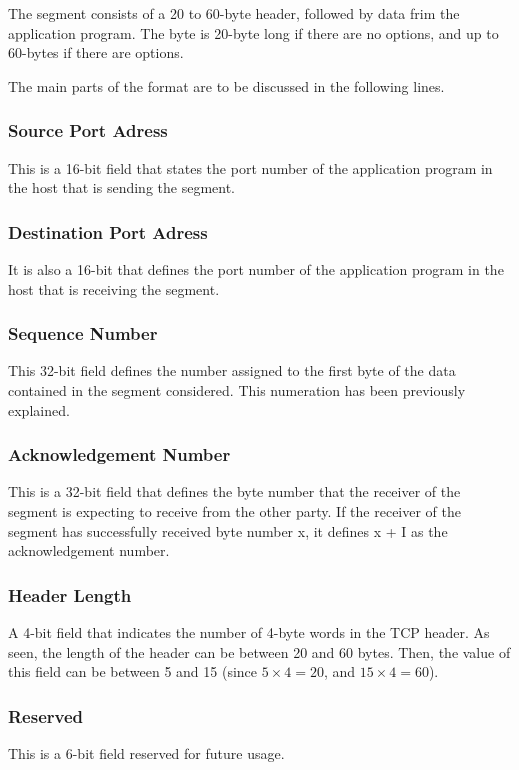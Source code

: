 \documentclass[12pt,a4paper]{report}
\begin{document}
The segment consists of a 20 to 60-byte header, followed by data frim the application program. The byte is 20-byte long if there are no options, and up to 60-bytes if there are options. 

The main parts of the format are to be discussed in the following lines.

\subsubsection{Source Port Adress}
This is a 16-bit field that states the port number of the application program in the host that is sending the segment. 

\subsubsection{Destination Port Adress}
It is also a 16-bit that defines the port number of the application program in the host that is receiving the segment. 

\subsubsection{Sequence Number}
This 32-bit field defines the number assigned to the first byte of the data contained in the segment considered. This numeration has been previously explained.

\subsubsection{Acknowledgement Number}
This is a 32-bit field that defines the byte number that the receiver of the segment is expecting to receive from the other party. If the receiver of the segment has successfully received byte number x, it defines x + I as the acknowledgement number. 

\subsubsection{Header Length}
A 4-bit field that indicates the number of 4-byte words in the TCP header. As seen, the length of the header can be between 20 and 60 bytes. Then, the value of this field can be between 5 and 15 (since $5\times	4=20$, and $15\times	4=60$). 

\subsubsection{Reserved}
This is a 6-bit field reserved for future usage.
\end{document}
